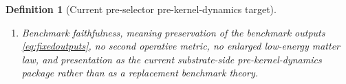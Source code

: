 \documentclass[11pt]{article}
\newcommand{\YoctoSelectorBody}[1]{\mathcal B_{#1}^{\mathrm{yoc,sel}}}
\newcommand{\YoctoSelectorShell}[1]{\mathcal Z_{#1}^{\mathrm{yoc,sel}}}
\newcommand{\PreSectionSelectorProj}[1]{\Pi_{#1}^{\mathrm{presel,sel}}}
\newcommand{\KernelProj}[1]{\Lambda_{#1}^{\mathrm{presel,ker}}}
\newcommand{\PreKernelBody}[1]{\mathcal P_{#1}^{\mathrm{presel,preker}}}
\newcommand{\PreKernelProj}[1]{\Upsilon_{#1}^{\mathrm{presel,preker}}}
\newcommand{\PreKernelFunctional}[1]{\mathscr S_{#1}^{\mathrm{presel,preker}}}
\newcommand{\PreKernelFullFiber}[2]{\mathcal W_{#1}^{\mathrm{presel,preker}}(#2)}
\newcommand{\PreKernelFullMin}[1]{\mathfrak u_{#1}^{\mathrm{presel,preker}}}
\newcommand{\PreKernelShell}[1]{\mathcal O_{#1}^{\mathrm{presel,preker}}}
\newcommand{\InducedKernelShell}[1]{\widetilde{\mathcal Y}_{#1}^{\mathrm{presel,ker}}}
\newtheorem{definition}{Definition}
\begin{document}
\begin{definition}[Current pre-selector pre-kernel-dynamics target]
\begin{enumerate}
\[    \left\{
    z\in\PreKernelBody{\sigma}:
    \PreSectionSelectorProj{\sigma}\bigl(\KernelProj{\sigma}(\PreKernelProj{\sigma}(z))\bigr)=y
    \right\}.
    \]
    The restriction of \(\PreKernelFunctional{\sigma}\) to \(\PreKernelFullFiber{\sigma}{y}\) is required to attain a unique minimizer depending smoothly on \(y\); write it as
    \[
    \PreKernelFullMin{\sigma}:\YoctoSelectorBody{\sigma}\to\PreKernelBody{\sigma}.
    \]
    The exact pre-kernel shell
    \[
    \PreKernelShell{\sigma}
    \equiv
    \left\{
    z\in\PreKernelBody{\sigma}:
    \PreSectionSelectorProj{\sigma}\bigl(\KernelProj{\sigma}(\PreKernelProj{\sigma}(z))\bigr)\in\YoctoSelectorShell{\sigma},
    \;
    \PreKernelFunctional{\sigma}(z)
    =
    \min_{p\in\PreKernelFullFiber{\sigma}{\PreSectionSelectorProj{\sigma}(\KernelProj{\sigma}(\PreKernelProj{\sigma}(z)))}} \PreKernelFunctional{\sigma}(p)
    \right\}
    \]
    is required to be a closed embedded submanifold, and
    \[
    \PreKernelProj{\sigma}\big|_{\PreKernelShell{\sigma}}
    :
    \PreKernelShell{\sigma}\xrightarrow{\cong}\InducedKernelShell{\sigma}
    \]
    is required to be a diffeomorphism.
    \item Benchmark faithfulness, meaning preservation of the benchmark outputs \eqref{eq:fixedoutputs}, no second operative metric, no enlarged low-energy matter law, and presentation as the current substrate-side pre-kernel-dynamics package rather than as a replacement benchmark theory.
\end{enumerate}
\end{definition}
\end{document}
